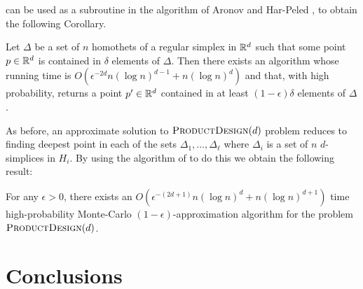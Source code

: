 \documentclass{llncs}
\newcommand{\eps}{\epsilon}
\begin{document}

 can be used as a subroutine in the
algorithm of Aronov and Har-Peled \cite[Theorem~3.3]{ah08}, to obtain
the following Corollary.

\begin{cor}
  Let $\Delta$ be a set of $n$ homothets of a regular simplex in $\mathbb{R}^d$
  such that some point $p\in\mathbb{R}^d$ is contained in $\delta$ elements
  of $\Delta$.  Then there exists an algorithm whose running time is
  $O(\eps^{-2d}n(\log n)^{d-1} + n(\log n)^d)$ and that, with high
  probability, returns a point $p'\in\mathbb{R}^{d}$ contained in at least
  $(1-\eps)\delta$ elements of $\Delta$.
\end{cor}

As before, an approximate solution to $\textsc{ProductDesign}(d)$ problem
reduces to finding deepest point in each of the sets
$\Delta_1,\ldots,\Delta_\ell$ where $\Delta_i$ is a set of $n$
$d$-simplices in $H_i$.  By using the algorithm of  to
do this we obtain the following result:

\begin{thm}
  For any $\eps >0$, there exists an $O(\eps^{-(2d+1)}n(\log n)^d + n(\log
  n)^{d+1})$ time high-probability Monte-Carlo $(1-\eps)$-approximation
  algorithm for the problem $\textsc{ProductDesign}(d)$.
\end{thm}

\section{Conclusions}
\end{document}

